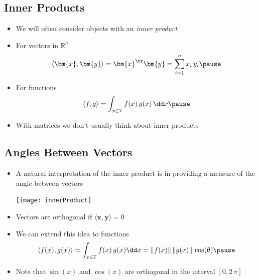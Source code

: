 
\begin{slide}
\section{Inner Products}

\begin{PauseHighLight}
  \begin{itemize}
  \item We will often consider objects with an \textit{inner product}\pause
  \item For vectors in $\mathbb{R}^n$
    \begin{align*}
      \langle \bm{x}, \bm{y} \rangle = \bm{x}^\tr\bm{y} = \sum_{i=1}^n
      x_i\,y_i \pause
    \end{align*}
  \item For functions
    \begin{align*}
      \langle f, g \rangle = \int_{x\in\mathcal{I}} f(x)\,g(x)\,\dd x\pause
    \end{align*}
  \item With matrices we don't usually think about inner products\pause
  \end{itemize}
\end{PauseHighLight}

\end{slide}


\begin{slide}
\section[-2]{Angles Between Vectors}

\begin{PauseHighLight}
  \begin{itemize}
  \item A natural interpretation of the inner product is in providing a
    measure of the angle between vectors\pause
    \begin{center}
      \texttt{[image: innerProduct]}
    \end{center}
  \item Vectors are orthogonal if $\langle \bm{x}, \bm{y} \rangle = 0$\pause
  \item We can extend this idea to functions
    \begin{align*}
      \langle f(x), g(x) \rangle = \int_{x \in \mathcal{I}}
      f(x)\, g(x) \dd x = \|f(x)\| \, \|g(x)\|\, \cos(\theta)\pause
    \end{align*}
  \item Note that $\sin(x)$ and $\cos(x)$ are orthogonal in the interval
    $[0,2\,\pi]$\pause
  \end{itemize}
\end{PauseHighLight}


\end{slide}

